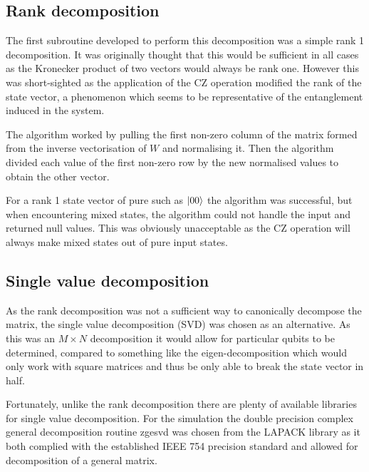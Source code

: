 
\subsection{Rank decomposition}

The first subroutine developed to perform this decomposition was a simple rank 1 decomposition. It was originally thought that this would be sufficient in all cases as the Kronecker product of two vectors would always be rank one. However this was short-sighted as the application of the CZ operation modified the rank of the state vector, a phenomenon which seems to be representative of the entanglement induced in the system.

The algorithm worked by pulling the first non-zero column of the matrix formed from the inverse vectorisation of $W$ and normalising it. Then the algorithm divided each value of the first non-zero row by the new normalised values to obtain the other vector.

For a rank 1 state vector of pure such as $\ket{00}$ the algorithm was successful, but when encountering mixed states, the algorithm could not handle the input and returned null values. This was obviously unacceptable as the CZ operation will always make mixed states out of pure input states.



\subsection{Single value decomposition}

As the rank decomposition was not a sufficient way to canonically decompose the matrix, the single value decomposition (SVD) was chosen as an alternative. As this was an $M \times N$ decomposition it would allow for particular qubits to be determined, compared to something like the eigen-decomposition which would only work with square matrices and thus be only able to break the state vector in half. 

Fortunately, unlike the rank decomposition there are plenty of available libraries for single value decomposition. For the simulation the double precision complex general decomposition routine zgesvd was chosen from the LAPACK library as it both complied with the established IEEE 754 precision standard and allowed for decomposition of a general matrix.

